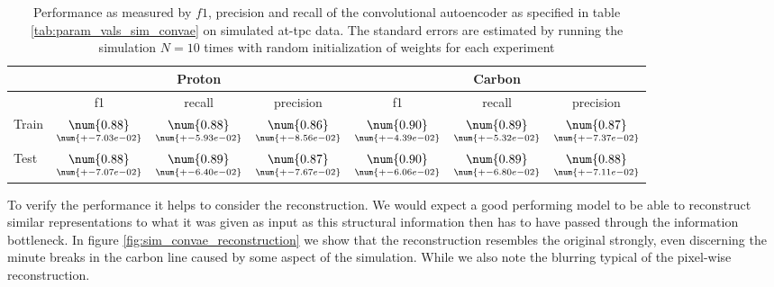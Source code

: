 \begin{table}
\begin{tabular}{lcccccc}
\toprule
{} & \multicolumn{3}{c}{Proton} & \multicolumn{3}{c}{Carbon} \\  
\midrule
 & f1 & recall & precision & f1 & recall & precision\\  
 Train & $ \underset{ \num{+- 7.03e-02 } } {\num{ 0.88 } }  $ & $ \underset{ \num{+- 5.93e-02 } } {\num{ 0.88 } }  $ & $ \underset{ \num{+- 8.56e-02 } } {\num{ 0.86 } }  $ & $ \underset{ \num{+- 4.39e-02 } } {\num{ 0.90 } }  $ & $ \underset{ \num{+- 5.32e-02 } } {\num{ 0.89 } }  $ & $ \underset{ \num{+- 7.37e-02 } } {\num{ 0.87 } }  $ \\ 
  Test & $ \underset{ \num{+- 7.07e-02 } } {\num{ 0.88 } }  $ & $ \underset{ \num{+- 6.40e-02 } } {\num{ 0.89 } }  $ & $ \underset{ \num{+- 7.67e-02 } } {\num{ 0.87 } }  $ & $ \underset{ \num{+- 6.06e-02 } } {\num{ 0.90 } }  $ & $ \underset{ \num{+- 6.80e-02 } } {\num{ 0.89 } }  $ & $ \underset{ \num{+- 7.11e-02 } } {\num{ 0.88 } }  $\\
\bottomrule
\end{tabular}
\caption{Performance as measured by $f1$, precision and recall of the convolutional autoencoder as specified in table \ref{tab:param_vals_sim_convae} on simulated at-tpc data. The standard errors are estimated by running the simulation $N=10$ times with random initialization of weights for each experiment}\label{tab:clf_simulated}
\end{table}

To verify the performance it helps to consider the reconstruction. We would expect a good performing model to be able to reconstruct similar representations to what it was given as input as this structural information then has to have passed through the information bottleneck. In figure \ref{fig:sim_convae_reconstruction} we show that the reconstruction resembles the original strongly, even discerning the minute breaks in the carbon line caused by some aspect of the simulation. While we also note the blurring typical of the pixel-wise reconstruction. 

